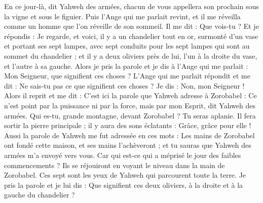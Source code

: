 \begin{multicols}{2}
En ce jour-là, dit Yahweh des armées, chacun de vous appellera son prochain sous la vigne et sous le figuier.
\VerseOne{}Puis l'Ange qui me parlait revint, et il me réveilla comme un homme que l’on réveille de son sommeil.
Il me dit : Que vois-tu ? Et je répondis : Je regarde, et voici, il y a un chandelier tout en or, surmonté d’un vase et portant ses sept lampes, avec sept conduits pour les sept lampes qui sont au sommet du chandelier ;
et il y a deux oliviers près de lui, l'un à la droite du vase, et l'autre à sa gauche.
Alors je pris la parole et je dis à l'Ange qui me parlait : Mon Seigneur, que signifient ces choses ?
L'Ange qui me parlait répondit et me dit : Ne sais-tu pas ce que signifient ces choses ? Je dis : Non, mon Seigneur !
Alors il reprit et me dit : C'est ici la parole que Yahweh adresse à Zorobabel : Ce n'est point par la puissance ni par la force, mais par mon Esprit, dit Yahweh des armées.
Qui es-tu, grande montagne, devant Zorobabel ? Tu seras aplanie. Il fera sortir la pierre principale ; il y aura des sons éclatants : Grâce, grâce pour elle !
Aussi la parole de Yahweh me fut adressée en ces mots :
Les mains de Zorobabel ont fondé cette maison, et ses mains l'achèveront ; et tu sauras que Yahweh des armées m'a envoyé vers vous.
Car qui est-ce qui a méprisé le jour des faibles commencements ? Ils se réjouiront en voyant le niveau dans la main de Zorobabel.  Ces sept sont les yeux de Yahweh qui parcourent toute la terre.
Je pris la parole et je lui dis : Que signifient ces deux oliviers, à la droite et à la gauche du chandelier ?

\end{multicols}
